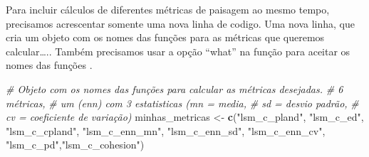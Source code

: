 \documentclass[
]{article}
\newenvironment{Shaded}{\begin{snugshade}}{\end{snugshade}}
\newcommand{\CommentTok}[1]{\textcolor[rgb]{0.56,0.35,0.01}{\textit{#1}}}
\newcommand{\FunctionTok}[1]{\textcolor[rgb]{0.13,0.29,0.53}{\textbf{#1}}}
\newcommand{\NormalTok}[1]{#1}
\newcommand{\OtherTok}[1]{\textcolor[rgb]{0.56,0.35,0.01}{#1}}
\newcommand{\StringTok}[1]{\textcolor[rgb]{0.31,0.60,0.02}{#1}}
\begin{document}
Para incluir cálculos de diferentes métricas de paisagem ao mesmo tempo, precisamos acrescentar somente uma nova linha de codigo. Uma nova linha, que cria um objeto com os nomes das funções para as métricas que queremos calcular\ldots.. Também precisamos usar a opção ``what'' na função para aceitar os nomes das funções .

\begin{Shaded}
\begin{Highlighting}[]
\CommentTok{\# Objeto com os nomes das funções para calcular as métricas desejadas.}
\CommentTok{\# 6 métricas, }
\CommentTok{\# um (enn) com 3 estatisticas (mn = media, }
\CommentTok{\#                              sd = desvio padrão, }
\CommentTok{\#                              cv = coeficiente de variação)}
\NormalTok{minhas\_metricas }\OtherTok{\textless{}{-}} \FunctionTok{c}\NormalTok{(}\StringTok{"lsm\_c\_pland"}\NormalTok{, }\StringTok{"lsm\_c\_ed"}\NormalTok{, }\StringTok{"lsm\_c\_cpland"}\NormalTok{, }
                     \StringTok{"lsm\_c\_enn\_mn"}\NormalTok{, }\StringTok{"lsm\_c\_enn\_sd"}\NormalTok{, }\StringTok{"lsm\_c\_enn\_cv"}\NormalTok{,}
                     \StringTok{"lsm\_c\_pd"}\NormalTok{,}\StringTok{"lsm\_c\_cohesion"}\NormalTok{)}


\end{Highlighting}
\end{Shaded}
\end{document}

